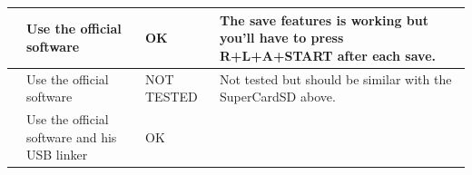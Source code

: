 \documentclass[12pt,a4paper]{article}
\begin{document}
    \begin{supertabular}{|p{3.5cm}|l|l|l|}
        \hline
            \begin{minipage}[c]{3cm}
            \vspace{0.5cm}
            \end{minipage} &
            \begin{minipage}{3cm}
            Use the official software
            \end{minipage} &
            \begin{minipage}{2cm}
            \textcolor{vert}{OK}
            \end{minipage} &
            \begin{minipage}{7cm}
            The save features is working but you'll have to press R+L+A+START after each save.
            \end{minipage} \\
        \hline
            \begin{minipage}[c]{3cm}
            \vspace{0.5cm}
            \end{minipage} &
            \begin{minipage}{3cm}
            Use the official software
            \end{minipage} &
            \begin{minipage}{2cm}
            \textcolor{bleu}{NOT TESTED}
            \end{minipage} &
            \begin{minipage}{7cm}
            Not tested but should be similar with the SuperCardSD above.
            \end{minipage} \\
        \hline
            \begin{minipage}[c]{3cm}
            \vspace{0.5cm}
            \end{minipage} &
            \begin{minipage}{3cm}
            Use the official software and his USB linker
            \end{minipage} &
            \begin{minipage}{2cm}
            \textcolor{vert}{OK}
            \end{minipage} &
            \begin{minipage}{7cm}

\end{minipage}
\end{supertabular}
\end{document}
